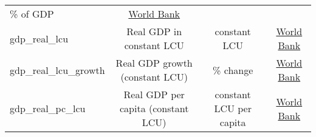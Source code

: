 \documentclass[]{article}
\begin{document}
\begin{longtable}[]{@{}lccc@{}}
\begin{minipage}[t]{0.24\columnwidth}
\% of GDP\strut
\end{minipage} & \begin{minipage}[t]{0.15\columnwidth}\centering\strut
\href{https://data.worldbank.org/indicator/ny.gdp.totl.rt.zs}{World
Bank}\strut
\end{minipage}\tabularnewline
\begin{minipage}[t]{0.14\columnwidth}\raggedright\strut
gdp\_real\_lcu\strut
\end{minipage} & \begin{minipage}[t]{0.36\columnwidth}\centering\strut
Real GDP in constant LCU\strut
\end{minipage} & \begin{minipage}[t]{0.24\columnwidth}\centering\strut
constant LCU\strut
\end{minipage} & \begin{minipage}[t]{0.15\columnwidth}\centering\strut
\href{https://data.worldbank.org/indicator/NY.GDP.MKTP.KN}{World
Bank}\strut
\end{minipage}\tabularnewline
\begin{minipage}[t]{0.14\columnwidth}\raggedright\strut
gdp\_real\_lcu\_growth\strut
\end{minipage} & \begin{minipage}[t]{0.36\columnwidth}\centering\strut
Real GDP growth (constant LCU)\strut
\end{minipage} & \begin{minipage}[t]{0.24\columnwidth}\centering\strut
\% change\strut
\end{minipage} & \begin{minipage}[t]{0.15\columnwidth}\centering\strut
\href{https://data.worldbank.org/indicator/NY.GDP.PCAP.KN}{World
Bank}\strut
\end{minipage}\tabularnewline
\begin{minipage}[t]{0.14\columnwidth}\raggedright\strut
gdp\_real\_pc\_lcu\strut
\end{minipage} & \begin{minipage}[t]{0.36\columnwidth}\centering\strut
Real GDP per capita (constant LCU)\strut
\end{minipage} & \begin{minipage}[t]{0.24\columnwidth}\centering\strut
constant LCU per capita\strut
\end{minipage} & \begin{minipage}[t]{0.15\columnwidth}\centering\strut
\href{https://data.worldbank.org/indicator/NY.GDP.PCAP.KD.ZG}{World
Bank}\strut
\end{minipage}\tabularnewline

\end{longtable}
\end{document}
